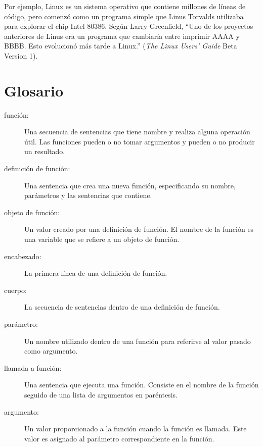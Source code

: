 \documentclass[10pt]{book}
\begin{document}
Por ejemplo, Linux es un sistema operativo que contiene millones de
líneas de código, pero comenzó como un programa simple que Linus Torvalds
utilizaba para explorar el chip Intel 80386.  Según Larry Greenfield,
``Uno de los proyectos anteriores de Linus era un programa que cambiaría
entre imprimir AAAA y BBBB.  Esto evolucionó más tarde a Linux.''
({\em The Linux Users' Guide} Beta Version 1).


\section{Glosario}

\begin{description}

\item[función:] Una secuencia de sentencias que tiene nombre y realiza alguna
operación útil.  Las funciones pueden o no tomar argumentos y pueden o no
producir un resultado.

\item[definición de función:]  Una sentencia que crea una nueva función,
especificando su nombre, parámetros y las sentencias que contiene.

\item[objeto de función:]  Un valor creado por una definición de función.
El nombre de la función es una variable que se refiere a un objeto
de función.

\item[encabezado:] La primera línea de una definición de función.

\item[cuerpo:] La secuencia de sentencias dentro de una definición de función.

\item[parámetro:] Un nombre utilizado dentro de una función para referirse al valor
pasado como argumento.

\item[llamada a función:] Una sentencia que ejecuta una función.
Consiste en el nombre de la función seguido de una lista de argumentos en
paréntesis.

\item[argumento:]  Un valor proporcionado a la función cuando la función es llamada.
Este valor es asignado al parámetro correspondiente en la función.


\end{description}
\end{document}
